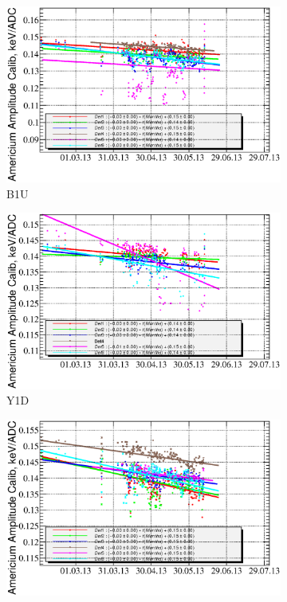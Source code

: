 \documentclass[a4paper,12pt]{article}
\newcommand\americium{${}^{241}$Am}
\begin{document}
\newcommand\amgainlabel{Timeline of the detector gain as measured with
$\alpha$-particles emitted by the \americium{} source. Colors represent individual
detectors.}
\begin{figure}[p]
%
\begin{subfigure}[t]{0.49\textwidth}
\includegraphics[width=\textwidth]{gfx/run13_alpha_study/B1U/c_chAmGain_by_day_B1U.eps}
\caption{B1U}
\end{subfigure}
%
\hfill
%
\begin{subfigure}[t]{0.49\textwidth}
\includegraphics[width=\textwidth]{gfx/run13_alpha_study/Y1D/c_chAmGain_by_day_Y1D.eps}
\caption{Y1D}
\end{subfigure}
%
\begin{subfigure}[t]{0.49\textwidth}
\includegraphics[width=\textwidth]{gfx/run13_alpha_study/B2D/c_chAmGain_by_day_B2D.eps}

\end{subfigure}
\end{figure}
\end{document}
